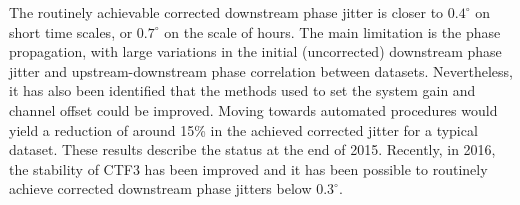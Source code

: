 The routinely achievable corrected downstream phase jitter is closer to \(0.4^\circ\) on short time scales, or \(0.7^\circ\) on the scale of hours. The main limitation is the phase propagation, with large variations in the initial (uncorrected) downstream phase jitter and upstream-downstream phase correlation between datasets. Nevertheless, it has also been identified that the methods used to set the system gain and channel offset could be improved. Moving towards automated procedures would yield a reduction of around 15\% in the achieved corrected jitter for a typical dataset. These results describe the status at the end of 2015. Recently, in 2016, the stability of CTF3 has been improved and it has been possible to routinely achieve corrected downstream phase jitters below \(0.3^\circ\).
